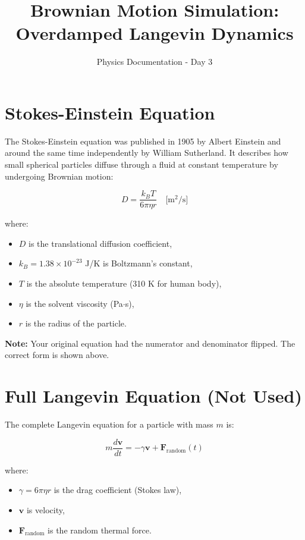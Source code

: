 \documentclass{article}
\begin{document}
\title{Brownian Motion Simulation: Overdamped Langevin Dynamics}
\author{Physics Documentation - Day 3}
\date{}
\maketitle

\section{Stokes-Einstein Equation}

The Stokes-Einstein equation was published in 1905 by Albert Einstein and around the same time independently by William Sutherland. 
It describes how small spherical particles diffuse through a fluid at constant temperature by undergoing Brownian motion:

\[
D = \frac{k_B T}{6 \pi \eta r} \quad \text{[m$^2$/s]}
\]

where:
\begin{itemize}
    \item $D$ is the translational diffusion coefficient,
    \item $k_B = 1.38 \times 10^{-23}$ J/K is Boltzmann's constant,
    \item $T$ is the absolute temperature (310 K for human body),
    \item $\eta$ is the solvent viscosity (Pa$\cdot$s),
    \item $r$ is the radius of the particle.
\end{itemize}

\textbf{Note:} Your original equation had the numerator and denominator flipped. The correct form is shown above.

\section{Full Langevin Equation (Not Used)}

The complete Langevin equation for a particle with mass $m$ is:

\[
m \frac{d\mathbf{v}}{dt} = -\gamma \mathbf{v} + \mathbf{F}_{\text{random}}(t)
\]

where:
\begin{itemize}
    \item $\gamma = 6\pi\eta r$ is the drag coefficient (Stokes law),
    \item $\mathbf{v}$ is velocity,
    \item $\mathbf{F}_{\text{random}}$ is the random thermal force.
\end{itemize}
\end{document}
